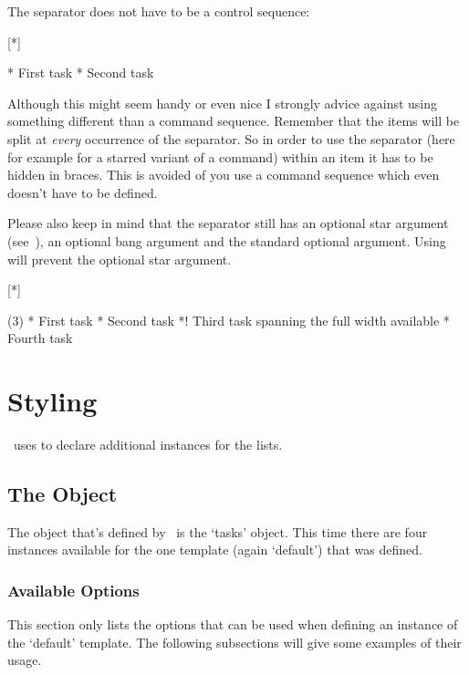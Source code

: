 \documentclass{tasks-manual}
\begin{document}
The separator does not have to be a control sequence:
\begin{example}
  [*]
  \begin{done}
    * First task
    * Second task
  \end{done}
\end{example}
Although this might seem handy or even nice I strongly advice against using
something different than a command sequence. Remember that the items will be
split at \emph{every} occurrence of the separator.  So in order to use the
separator (here for example for a starred variant of a command) within an item
it has to be hidden in braces.  This is avoided of you use a command sequence
which even doesn't have to be defined.

Please also keep in mind that the separator still has an optional star
argument (see~\pageref{optional-star}), an optional bang argument and the
standard optional argument.  Using \code{*} will prevent the optional star
argument.

\begin{example}
  [*]
  \begin{done}(3)
    * First task
    * Second task
    *! Third task spanning the full width available
    * Fourth task
  \end{done}
\end{example}

\section{Styling \Tasks}
\Tasks\ uses  to declare additional instances for the lists.

\subsection{The  Object}\label{sec:tasks}
The object that's defined by \Tasks\ is the `tasks' object.  This time there
are four instances available for the one template (again `default') that was
defined.

\subsubsection{Available Options}
This section only lists the options that can be used when defining an instance
of the `default' template.  The following subsections will give some examples
of their usage.
\end{document}
